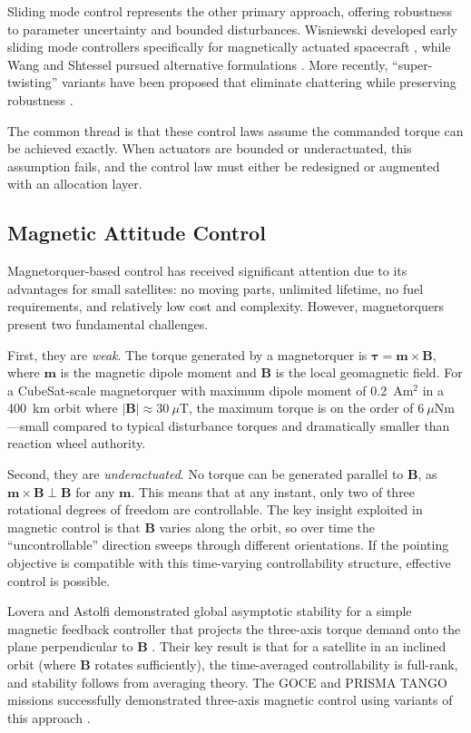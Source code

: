 \documentclass[conference]{IEEEtran}
\begin{document}
Sliding mode control represents the other primary approach, offering robustness to parameter uncertainty and bounded disturbances. Wisniewski developed early sliding mode controllers specifically for magnetically actuated spacecraft \cite{wisniewski_satellite_1997}, while Wang and Shtessel pursued alternative formulations \cite{wang_satellite_1998}. More recently, ``super-twisting'' variants have been proposed that eliminate chattering while preserving robustness \cite{janardhanan_attitude_2012}.

The common thread is that these control laws assume the commanded torque can be achieved exactly. When actuators are bounded or underactuated, this assumption fails, and the control law must either be redesigned or augmented with an allocation layer.

\subsection{Magnetic Attitude Control}\label{subsec:magnetic_control}
Magnetorquer-based control has received significant attention due to its advantages for small satellites: no moving parts, unlimited lifetime, no fuel requirements, and relatively low cost and complexity. However, magnetorquers present two fundamental challenges.

First, they are \emph{weak}. The torque generated by a magnetorquer is $\boldsymbol{\tau} = \mathbf{m} \times \mathbf{B}$, where $\mathbf{m}$ is the magnetic dipole moment and $\mathbf{B}$ is the local geomagnetic field. For a CubeSat-scale magnetorquer with maximum dipole moment of 0.2~Am$^2$ in a 400~km orbit where $|\mathbf{B}| \approx 30~\mu$T, the maximum torque is on the order of $6~\mu$Nm---small compared to typical disturbance torques and dramatically smaller than reaction wheel authority.

Second, they are \emph{underactuated}. No torque can be generated parallel to $\mathbf{B}$, as $\mathbf{m} \times \mathbf{B} \perp \mathbf{B}$ for any $\mathbf{m}$. This means that at any instant, only two of three rotational degrees of freedom are controllable. The key insight exploited in magnetic control is that $\mathbf{B}$ varies along the orbit, so over time the ``uncontrollable'' direction sweeps through different orientations. If the pointing objective is compatible with this time-varying controllability structure, effective control is possible.

Lovera and Astolfi demonstrated global asymptotic stability for a simple magnetic feedback controller that projects the three-axis torque demand onto the plane perpendicular to $\mathbf{B}$ \cite{lovera_spacecraft_2004, lovera_global_2005}. Their key result is that for a satellite in an inclined orbit (where $\mathbf{B}$ rotates sufficiently), the time-averaged controllability is full-rank, and stability follows from averaging theory. The GOCE and PRISMA TANGO missions successfully demonstrated three-axis magnetic control using variants of this approach \cite{sechi_magnetic_2005, chasset_3_axis_2013}.
\end{document}
